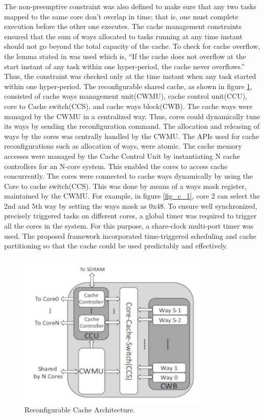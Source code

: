 \documentclass[conference]{IEEEtran}
\begin{document}
    
    The non-preemptive constraint was also defined to make sure that any two tasks mapped to the same core don’t overlap in time; that is, one must complete execution before the other one executes.
    The cache management constraints ensured that the sum of ways allocated to tasks running at any time instant should not go beyond the total capacity of the cache. To check for cache overflow, the lemma stated in \cite{b4}was used which is, “If the cache does not overflow at the start instant of
    any task within one hyper-period, the cache never overflows.” Thus, the  constraint was checked only at the time instant when any task started within one hyper-period.
    The reconfigurable shared cache, as shown in figure \ref{fig_c_2}, consisted of cache ways management unit(CWMU), cache control unit(CCU), core to Cache switch(CCS), and cache ways block(CWB). The cache ways were managed by the CWMU in a centralized way. Thus, cores could dynamically tune its ways by sending the reconfiguration command. The allocation and releasing of ways by the cores was centrally handled by the CWMU. The APIs used for cache reconfigurations such as allocation of ways, were atomic. The cache memory accesses were managed by the Cache Control Unit by instantiating N cache controllers for an N-core system. This enabled the cores to access cache concurrently. The cores were connected to cache ways dynamically by using the Core to cache switch(CCS). This was done by means of a ways mask register, maintained by the CWMU. For example, in figure \ref{fig_c_1}, core 2 can select the 2nd and 5th way by setting the ways mask as 0x48. To ensure well synchronized, precisely triggered tasks on different cores, a global timer was required to trigger all the cores in the system. For this purpose, a share-clock multi-port timer was used. The proposed framework incorporated time-triggered scheduling and cache partitioning so that the cache could be used predictably and effectively.
    
    \begin{figure}[htbp]
        \centerline{\includegraphics{ReconfigurableCache.jpg}}
        \caption{Reconfigurable Cache Architecture.\cite{b3}}
        \label{fig_c_2}
    \end{figure}
\end{document}
